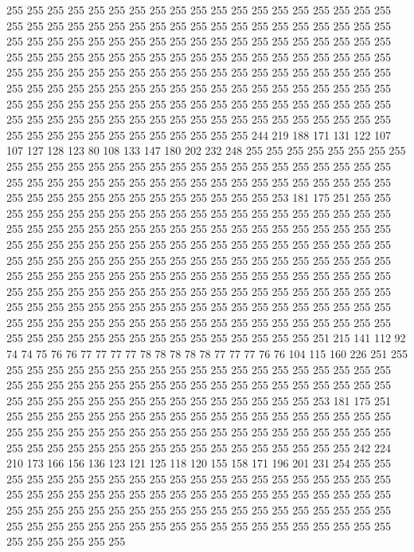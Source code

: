 255 255 255 255 255 255 255 255 255 255 255 255 255 255 255 255 255 255 255 255
255 255 255 255 255 255 255 255 255 255 255 255 255 255 255 255 255 255 255 255
255 255 255 255 255 255 255 255 255 255 255 255 255 255 255 255 255 255 255 255
255 255 255 255 255 255 255 255 255 255 255 255 255 255 255 255 255 255 255 255
255 255 255 255 255 255 255 255 255 255 255 255 255 255 255 255 255 255 255 255
255 255 255 255 255 255 255 255 255 255 255 255 255 255 255 255 255 255 255 255
255 255 255 255 255 255 255 255 255 255 255 255 255 255 255 255 255 255 255 255
255 255 255 255 255 255 255 255 255 255 255 255 255 255 255 255 255 255 255 255
255 255 255 255 244 219 188 171 131 122 107 107 127 128 123 80 108 133 147 180
202 232 248 255 255 255 255 255 255 255 255 255 255 255 255 255 255 255 255 255
255 255 255 255 255 255 255 255 255 255 255 255 255 255 255 255 255 255 255 255
255 255 255 255 255 255 255 255 255 255 255 255 255 255 255 255 255 255 255 255
255 255 253 181 175 251 255 255 255 255 255 255 255 255 255 255 255 255 255 255
255 255 255 255 255 255 255 255 255 255 255 255 255 255 255 255 255 255 255 255
255 255 255 255 255 255 255 255 255 255 255 255 255 255 255 255 255 255 255 255
255 255 255 255 255 255 255 255 255 255 255 255 255 255 255 255 255 255 255 255
255 255 255 255 255 255 255 255 255 255 255 255 255 255 255 255 255 255 255 255
255 255 255 255 255 255 255 255 255 255 255 255 255 255 255 255 255 255 255 255
255 255 255 255 255 255 255 255 255 255 255 255 255 255 255 255 255 255 255 255
255 255 255 255 255 255 255 255 255 255 255 255 255 255 255 255 255 255 255 255
255 255 255 255 255 255 255 255 255 255 255 255 255 255 255 251 215 141 112 92
74 74 75 76 76 77 77 77 77 78 78 78 78 78 77 77 77 76 76 104
115 160 226 251 255 255 255 255 255 255 255 255 255 255 255 255 255 255 255 255
255 255 255 255 255 255 255 255 255 255 255 255 255 255 255 255 255 255 255 255
255 255 255 255 255 255 255 255 255 255 255 255 255 255 255 255 255 255 253 181
175 251 255 255 255 255 255 255 255 255 255 255 255 255 255 255 255 255 255 255
255 255 255 255 255 255 255 255 255 255 255 255 255 255 255 255 255 255 255 255
255 255 255 255 255 255 255 255 255 255 255 255 255 255 255 255 255 242 224 210
173 166 156 136 123 121 125 118 120 155 158 171 196 201 231 254 255 255 255 255
255 255 255 255 255 255 255 255 255 255 255 255 255 255 255 255 255 255 255 255
255 255 255 255 255 255 255 255 255 255 255 255 255 255 255 255 255 255 255 255
255 255 255 255 255 255 255 255 255 255 255 255 255 255 255 255 255 255 255 255
255 255 255 255 255 255 255 255 255 255 255 255 255 255 255 255 255 255 255 255
